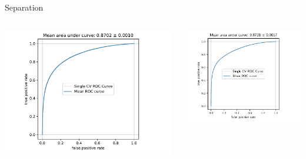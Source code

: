 \begin{frame}[t]{Separation}
\begin{columns}[onlytextwidth]
    \begin{column}{0.475\textwidth}
        \includegraphics[width=1.2\textwidth,page=1]{fig/separation_performance.pdf}
    \end{column}
    \begin{column}{0.475\textwidth}
        \includegraphics[width=1.2\textwidth,page=1]{fig/separator_performance.pdf}
    \end{column}
\end{columns}
\end{frame}

